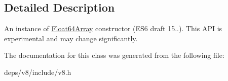 \subsection{Detailed Description}
An instance of \hyperlink{classv8_1_1_float64_array}{Float64\+Array} constructor (E\+S6 draft 15..). This A\+P\+I is experimental and may change significantly. 

The documentation for this class was generated from the following file\+:\begin{DoxyCompactItemize}
\item 
deps/v8/include/v8.\+h\end{DoxyCompactItemize}
